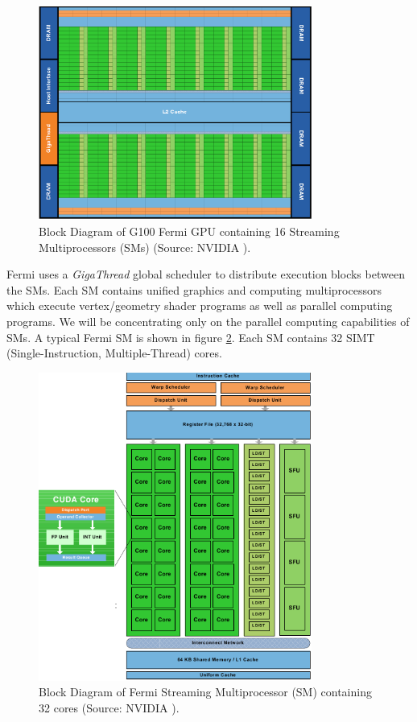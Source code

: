 \begin{figure}[h]
	\centerline{
   \includegraphics[width=0.8\textwidth]{./Data/nvidia/architecture_fermi}  	
	}
	\caption{ Block Diagram of G100 Fermi GPU containing 16 Streaming Multiprocessors (SMs) (Source: NVIDIA \cite{fermiWhitepaper}).}
\label{fig:fermi:arch}
\end{figure}

Fermi uses a {\it GigaThread} global scheduler to distribute execution blocks between the SMs. Each SM contains unified graphics and computing multiprocessors which execute vertex/geometry shader programs as well as parallel computing programs. We will be concentrating only on the parallel computing capabilities of SMs. A typical Fermi SM is shown in figure \ref{fig:fermi:sm}. Each SM contains 32 SIMT (Single-Instruction, Multiple-Thread) cores. 

\begin{figure}[h]
	\centerline{
   \includegraphics[width=0.8\textwidth]{./Data/nvidia/sm_fermi}  	
	}
	\caption{ Block Diagram of Fermi Streaming Multiprocessor (SM) containing 32 cores (Source: NVIDIA \cite{fermiWhitepaper}).}
\label{fig:fermi:sm}
\end{figure}

